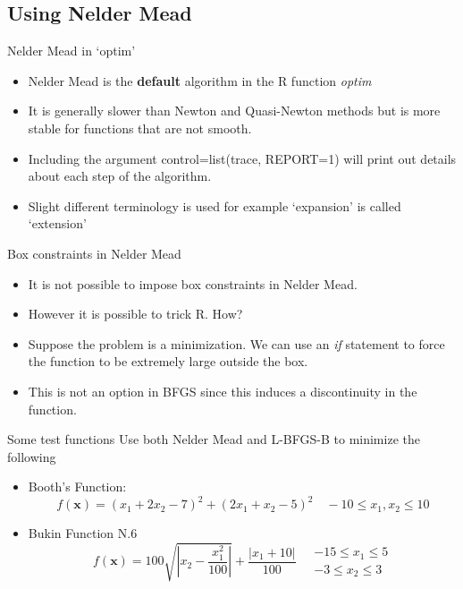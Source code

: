 \documentclass[10pt]{beamer}
\begin{document}
\subsection{Using Nelder Mead}
\begin{frame}{Nelder Mead in `optim'}
  \begin{itemize}
  \item Nelder Mead is the {\bf default} algorithm in the R function {\em optim}
  \item It is generally slower than Newton and Quasi-Newton methods but is more stable for functions that are not smooth.
  \item Including the argument
    control=list(trace, REPORT=1) will print out details about each step of the algorithm.
  \item Slight different terminology is used for example `expansion' is called `extension'
  \end{itemize}
\end{frame}
\begin{frame}{Box constraints in Nelder Mead}
  \begin{itemize}
  \item It is not possible to impose box constraints in Nelder Mead.

  \item However it is possible to trick R.  How?

  \item Suppose the problem is a minimization.  We can use an {\em if} statement to force the function to be extremely large outside the box.

  \item This is not an option in BFGS since this induces a discontinuity in the function.
  \end{itemize}
\end{frame}
\begin{frame}{Some test functions}
  Use both Nelder Mead and L-BFGS-B to minimize the following
  \begin{itemize}
  \item Booth's Function:
    \begin{equation*}
      f({\bm x})=(x_1+2x_2-7)^2+(2x_1+x_2-5)^2
      \quad-10\leq x_1,x_2\leq 10
    \end{equation*}
  \item Bukin Function N.6
    \begin{equation*}
      f({\bm x})=100\sqrt{\left|x_2-\frac{x_1^2}{100}\right|}+\frac{|x_1+10|}{100}
      \quad\begin{array}{c}
             -15\leq x_1\leq 5\\
             -3\leq x_2\leq 3
           \end{array}
         \end{equation*}
       \end{itemize}
     \end{frame}
\end{document}
